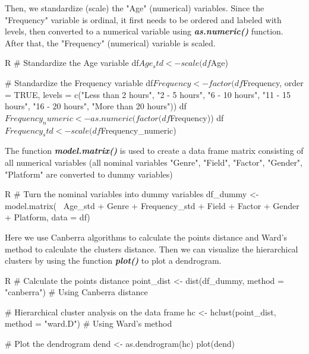     Then, we standardize (scale) the "Age" (numerical) variables. Since the "Frequency" variable is ordinal, it first needs to be ordered and labeled with levels, then converted to a numerical variable using \textbf{\textit{as.numeric()}} function. After that, the "Frequency" (numerical) variable is scaled.

    \begin{code}{R}
        # Standardize the Age variable
        df$Age_std <- scale(df$Age)
        
        # Standardize the Frequency variable
        df$Frequency <- factor(
              df$Frequency, 
              order = TRUE,
              levels = c("Less than 2 hours", "2 - 5 hours", "6 - 10 hours", "11 - 15 hours", "16 - 20 hours", "More than 20 hours"))
        df$Frequency_numeric <- as.numeric(factor(df$Frequency))
        df$Frequency_std <- scale(df$Frequency_numeric)
    \end{code}

    The function \textbf{\textit{model.matrix()}} is used to create a data frame matrix consisting of all numerical variables (all nominal variables "Genre", "Field", "Factor", "Gender", "Platform" are converted to dummy variables)
    
    \begin{code}{R}
        # Turn the nominal variables into dummy variables
        df_dummy <- model.matrix(~ Age_std + Genre + Frequency_std + Field + Factor + Gender + Platform, data = df)
    \end{code}

    Here we use Canberra algorithms to calculate the points distance and Ward's method to calculate the clusters distance. Then we can visualize the hierarchical clusters by using the function \textbf{\textit{plot()}} to plot a dendrogram.
    
    \begin{code}{R}
        # Calculate the points distance
        point_dist <- dist(df_dummy, method = "canberra")      # Using Canberra distance
        
        # Hierarchical cluster analysis on the data frame
        hc <- hclust(point_dist, method = "ward.D")            # Using Ward's method
        
        # Plot the dendrogram
        dend <- as.dendrogram(hc)
        plot(dend)
    \end{code}

